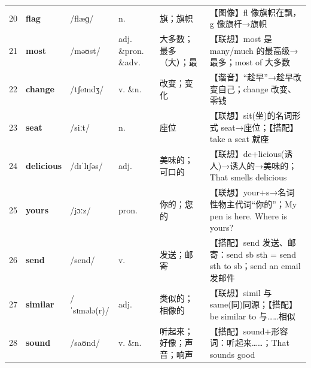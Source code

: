 \documentclass[UTF8,a4paper,11pt,oneside]{ctexbook}
\newcommand{\cellword}[1]{{\bfseries\textcolor{wordcol}{#1}}}
\newcommand{\cellipa}[1]{{\footnotesize\textcolor{ipacol}{#1}}}
\newcommand{\cellpos}[1]{\textcolor{poscol}{#1}}
\newcommand{\cellno}[1]{\textcolor{volcolor!75!black}{#1}}
\begin{document}
{\begin{longtable}{@{}C{0.045\textwidth}L{0.155\textwidth}L{0.175\textwidth}C{0.070\textwidth}L{0.180\textwidth}L{0.282\textwidth}@{}}
\cellno{20} & \cellword{flag} & \cellipa{/flæɡ/} & \cellpos{n.} & 旗；旗帜 & \textcolor{tagImage}{【图像】}fl 像旗帜在飘，g 像旗杆→\allowbreak{}旗帜 \\
 \cellno{21} & \cellword{most} & \cellipa{/məʊst/} & \cellpos{adj. \&pron. \&adv.} & 大多数；最多（大）；最 & \textcolor{tagAssoc}{【联想】}most 是 many/much 的最高级→\allowbreak{}最多；most of 大多数 \\
\cellno{22} & \cellword{change} & \cellipa{/tʃeɪndʒ/} & \cellpos{v. \&n.} & 改变；变化 & \textcolor{tagSound}{【谐音】}“趁早”→\allowbreak{}趁早改变自己；change 改变、零钱 \\
 \cellno{23} & \cellword{seat} & \cellipa{/siːt/} & \cellpos{n.} & 座位 & \textcolor{tagAssoc}{【联想】}sit(坐)的名词形式 seat→\allowbreak{}座位；\textcolor{tagColloc}{【搭配】}take a seat 就座 \\
\cellno{24} & \cellword{delicious} & \cellipa{/dɪˈlɪʃəs/} & \cellpos{adj.} & 美味的；可口的 & \textcolor{tagAssoc}{【联想】}de+licious(诱人)→\allowbreak{}诱人的→\allowbreak{}美味的；That smells delicious \\
 \cellno{25} & \cellword{yours} & \cellipa{/jɔːz/} & \cellpos{pron.} & 你的；您的 & \textcolor{tagAssoc}{【联想】}your+s→\allowbreak{}名词性物主代词“你的”；My pen is here. Where is yours? \\
\cellno{26} & \cellword{send} & \cellipa{/send/} & \cellpos{v.} & 发送；邮寄 & \textcolor{tagColloc}{【搭配】}send 发送、邮寄：send sb sth = send sth to sb；send an email 发邮件 \\
 \cellno{27} & \cellword{similar} & \cellipa{/ˈsɪmələ(r)/} & \cellpos{adj.} & 类似的；相像的 & \textcolor{tagAssoc}{【联想】}simil 与 same(同)同源；\textcolor{tagColloc}{【搭配】}be similar to 与……相似 \\
\cellno{28} & \cellword{sound} & \cellipa{/saʊnd/} & \cellpos{v. \&n.} & 听起来；好像；声音；响声 & \textcolor{tagColloc}{【搭配】}sound+形容词：听起来……；That sounds good \\
\end{longtable}
}

\end{document}
